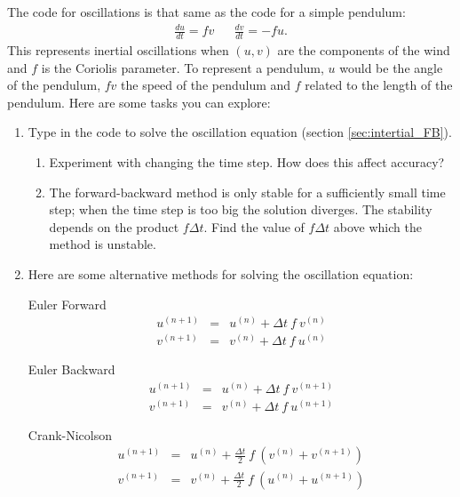 The code for oscillations is that same as the code for a simple pendulum:
\begin{eqnarray*}
\frac{du}{dt}=fv &  & \frac{dv}{dt}=-fu.
\end{eqnarray*}
This represents inertial oscillations when $(u,v)$ are the components
of the wind and $f$ is the Coriolis parameter. To represent a pendulum,
$u$ would be the angle of the pendulum, $fv$ the speed of the pendulum
and $f$ related to the length of the pendulum. Here are some tasks
you can explore:
\begin{enumerate}
\item Type in the code to solve the oscillation equation (section \ref{sec:intertial_FB}).
\begin{enumerate}
\item Experiment with changing the time step. How does this affect accuracy?
\item The forward-backward method is only stable for a sufficiently small
time step; when the time step is too big the solution diverges. The
stability depends on the product $f\Delta t$. Find the value of $f\Delta t$
above which the method is unstable.\clearpage{}
\end{enumerate}
\item Here are some alternative methods for solving the oscillation equation:\\
\begin{minipage}[t]{0.45\columnwidth}%
\begin{center}
Euler Forward
\begin{eqnarray*}
u^{(n+1)} & = & u^{(n)}+\Delta t\ f\ v^{(n)}\\
v^{(n+1)} & = & v^{(n)}+\Delta t\ f\ u^{(n)}
\end{eqnarray*}
\par\end{center}
\begin{center}
Euler Backward
\begin{eqnarray*}
u^{(n+1)} & = & u^{(n)}+\Delta t\ f\ v^{(n+1)}\\
v^{(n+1)} & = & v^{(n)}+\Delta t\ f\ u^{(n+1)}
\end{eqnarray*}
\par\end{center}
\begin{center}
Crank-Nicolson
\begin{eqnarray*}
u^{(n+1)} & = & u^{(n)}+\frac{\Delta t}{2}\ f\ \left(v^{(n)}+v^{(n+1)}\right)\\
v^{(n+1)} & = & v^{(n)}+\frac{\Delta t}{2}\ f\ \left(u^{(n)}+u^{(n+1)}\right)

\end{eqnarray*}
\end{center}
\end{minipage}
\end{enumerate}
